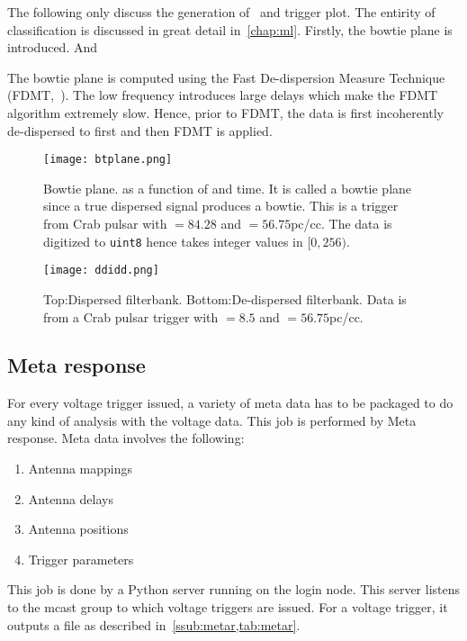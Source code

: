 \par The following only discuss the generation of \dbson~and trigger plot. 
The entirity of classification is discussed in great detail in~\autoref{chap:ml}.
Firstly, the bowtie plane is introduced. And

\par The bowtie plane is computed using the Fast De-dispersion Measure Technique (FDMT,~\cite{fdmt}).
The low frequency introduces large delays which make the FDMT algorithm extremely slow. 
Hence, prior to FDMT, the data is first incoherently de-dispersed to first \dm and then FDMT is applied.

\begin{figure}
	\label{fig:bt}
	\centering
	\texttt{[image: btplane.png]}
	\caption{Bowtie plane. \sn as a function of \dm and time. 
	It is called a bowtie plane since a true dispersed signal produces a bowtie.
	This is a trigger from Crab pulsar with \sn$=84.28$ and \dm$=56.75$pc/cc.
	The data is digitized to \texttt{uint8} hence takes integer values in $[0,256)$.
}
\end{figure}

\begin{figure}
	\label{fig:dd}
	\centering
	\texttt{[image: ddidd.png]}
	\caption{Top:Dispersed filterbank. Bottom:De-dispersed filterbank.
		Data is from a Crab pulsar trigger with \sn$=8.5$ and \dm$=56.75$pc/cc.
	}
\end{figure}

\subsection {Meta response}
\par For every voltage trigger issued, a variety of meta data has to be packaged to do any kind of analysis with the voltage data. 
This job is performed by Meta response. Meta data involves the following:
\begin{enumerate}
\item Antenna mappings
\item Antenna delays
\item Antenna positions
\item Trigger parameters
\end{enumerate}

\par This job is done by a Python server running on the login node. 
This server listens to the mcast group to which voltage triggers are issued.
For a voltage trigger, it outputs a  file as described in~\autoref{ssub:metar,tab:metar}.

